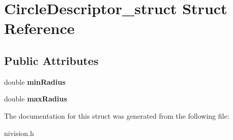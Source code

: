 \hypertarget{structCircleDescriptor__struct}{\section{\-Circle\-Descriptor\-\_\-struct \-Struct \-Reference}
\label{structCircleDescriptor__struct}
}
\subsection*{\-Public \-Attributes}
\begin{DoxyCompactItemize}
\item 
\hypertarget{structCircleDescriptor__struct_a4f4b9ecc5e5dba6911c0c6e3b6c03894}{double {\bfseries min\-Radius}}\label{structCircleDescriptor__struct_a4f4b9ecc5e5dba6911c0c6e3b6c03894}

\item 
\hypertarget{structCircleDescriptor__struct_a0064cd6f2c97b9ad800a9dbcc0230a33}{double {\bfseries max\-Radius}}\label{structCircleDescriptor__struct_a0064cd6f2c97b9ad800a9dbcc0230a33}

\end{DoxyCompactItemize}


\-The documentation for this struct was generated from the following file\-:\begin{DoxyCompactItemize}
\item 
nivision.\-h\end{DoxyCompactItemize}
